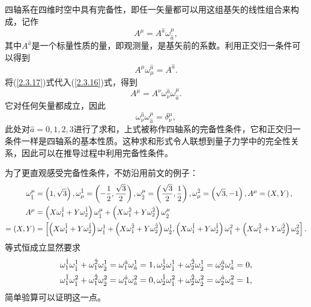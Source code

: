 \documentclass[11pt, a4paper, oneside, onecolumn]{ctexart}
\numberwithin{equation}{subsection}
\begin{document}
四轴系在四维时空中具有完备性，即任一矢量都可以用这组基矢的线性组合来构成，记作
\begin{equation}
A^{\mu}=A^{\hat{a}}\omega^{\mu}_{\hat{a}},\label{2.3.16}
\end{equation}
其中$A^{\hat{a}}$是一个标量性质的量，即观测量，是基矢前的系数。利用正交归一条件可以得到
\begin{equation}
A^{\mu}\omega_{\mu}^{\hat{a}}=A^{\hat{a}}.\label{2.3.17}
\end{equation}
将(\ref{2.3.17})式代入(\ref{2.3.16})式，得到
\begin{equation}
A^{\mu}=A^{\nu}\omega_{\nu}^{\hat{a}}\omega_{\hat{a}}^{\mu}.
\end{equation}
它对任何矢量都成立，因此
\begin{equation}
\omega^{\hat{a}}_{\nu}\omega^{\mu}_{\hat{a}}=\delta{}^{\mu}_{\nu},
\end{equation}
此处对$\hat{a}=0,1,2,3$进行了求和，上式被称作四轴系的完备性条件，它和正交归一条件一样是四轴系的基本性质。这种求和形式令人联想到量子力学中的完全性关系，因此可以在推导过程中利用完备性条件。

为了更直观感受完备性条件，不妨沿用前文的例子：
\begin{align}
\omega^{\mu}_{\hat{1}}&=\left(1,\sqrt{3}\right),\omega_{\mu}^{\hat{1}}=\left(-\frac{1}{2},\frac{\sqrt{3}}{2}\right),\omega^{\mu}_{\hat{2}}=\left(\frac{\sqrt{3}}{2},\frac{1}{2}\right),\omega_{\mu}^{\hat{2}}=\left(\sqrt{3},-1\right),A^{\mu}=\left(X,Y\right),\notag\\
A^{\mu}&=\left(X\omega^{\hat{1}}_{1}+Y\omega^{\hat{1}}_{2}\right)\omega^{\mu}_{\hat{1}}+\left(X\omega^{\hat{2}}_{1}+Y\omega^{\hat{2}}_{2}\right)\omega^{\mu}_{\hat{2}}\notag\\
=\left(X,Y\right)&=\left[\left(X\omega^{\hat{1}}_{1}+Y\omega^{\hat{1}}_{2}\right)\omega^{1}_{\hat{1}}+\left(X\omega^{\hat{2}}_{1}+Y\omega^{\hat{2}}_{2}\right)\omega^{1}_{\hat{2}},\left(X\omega^{\hat{1}}_{1}+Y\omega^{\hat{1}}_{2}\right)\omega^{2}_{\hat{1}}+\left(X\omega^{\hat{2}}_{1}+Y\omega^{\hat{2}}_{2}\right)\omega^{2}_{\hat{2}}\right].\notag
\end{align}
等式恒成立显然要求
\begin{align}
\omega^{\hat{1}}_{1}\omega^{1}_{\hat{1}}+\omega^{\hat{2}}_{1}\omega^{1}_{\hat{2}}=\omega^{\hat{a}}_{1}\omega^{1}_{\hat{a}}=1,\omega^{\hat{1}}_{2}\omega^{1}_{\hat{1}}+\omega^{\hat{2}}_{2}\omega^{1}_{\hat{2}}=\omega^{\hat{a}}_{2}\omega^{1}_{\hat{a}}=0,\notag\\
\omega^{\hat{1}}_{1}\omega^{2}_{\hat{1}}+\omega^{\hat{2}}_{1}\omega^{2}_{\hat{2}}=\omega^{\hat{a}}_{1}\omega^{2}_{\hat{a}}=0,\omega^{\hat{1}}_{2}\omega^{2}_{\hat{1}}+\omega^{\hat{2}}_{2}\omega^{2}_{\hat{2}}=\omega^{\hat{a}}_{2}\omega^{2}_{\hat{a}}=1,\notag
\end{align}
简单验算可以证明这一点。
\end{document}
